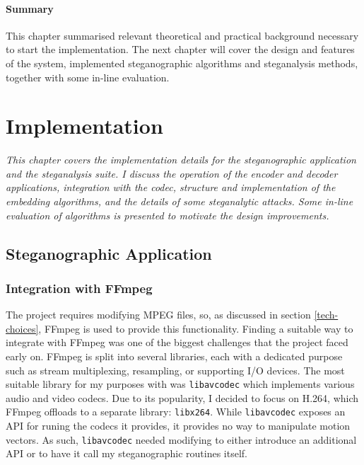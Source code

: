 \documentclass[12pt,british,twoside,notitlepage,usenames,dvipsnames,hypens,final]{report}
\numberwithin{equation}{section}
\numberwithin{figure}{section}
\begin{document}
\bigskip\bigskip
\subsubsection*{Summary}
This chapter summarised relevant theoretical and practical background necessary to start the implementation. The next chapter will cover the design and features of the system, implemented steganographic algorithms and steganalysis methods, together with some in-line evaluation.

\cleardoublepage
\chapter{Implementation}

\textit{This chapter covers the implementation details for the steganographic application and the steganalysis suite. I discuss the operation of the encoder and decoder applications, integration with the codec, structure and implementation of the embedding algorithms, and the details of some steganalytic attacks. Some in-line evaluation of algorithms is presented to motivate the design improvements.}

\section{Steganographic Application}

\subsection{Integration with FFmpeg}
\label{integrate-ffmpeg}

The project requires modifying MPEG files, so, as discussed in section \ref{tech-choices}, FFmpeg is used to provide this functionality. Finding a suitable way to integrate with FFmpeg was one of the biggest challenges that the project faced early on. FFmpeg is split into several libraries, each with a dedicated purpose such as stream multiplexing, resampling, or supporting I/O devices. The most suitable library for my purposes with was \texttt{libavcodec} which implements various audio and video codecs. Due to its popularity, I decided to focus on H.264, which FFmpeg offloads to a separate library: \texttt{libx264}. While \texttt{libavcodec} exposes an API for runing the codecs it provides, it provides no way to manipulate motion vectors. As such, \texttt{libavcodec} needed modifying to either introduce an additional API or to have it call my steganographic routines itself.
\end{document}

